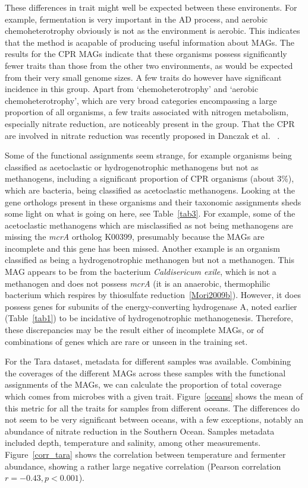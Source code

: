 \documentclass[10pt,letterpaper]{article}
\begin{document}
These differences in trait might well be expected between these environents. For example, fermentation is very important in the AD process, and aerobic chemoheterotrophy obviously is not as the environment is aerobic. This indicates that the method is acapable of producing useful information about MAGs. The results for the CPR MAGs indicate that these organisms possess significantly fewer traits than those from the other two environments, as would be expected from their very small genome sizes. A few traits do however have significant incidence in this group. Apart from `chemoheterotrophy' and `aerobic chemoheterotrophy', which are very broad categories encompassing a large proportion of all organisms, a few traits associated with nitrogen metabolism, especially nitrate reduction, are noticeably present in the group. That the CPR are involved in nitrate reduction was recently proposed in Danczak et al. ~\cite{Danczak2017}.

Some of the functional assignments seem strange, for example organisms being classified as acetoclastic or hydrogenotrophic methanogens but not as methanogens, including a significant proportion of CPR organisms (about 3\%), which are bacteria, being classified as acetoclastic methanogens. Looking at the gene orthologs present in these organisms and their taxonomic assignments sheds some light on what is going on here, see Table~\ref{tab3}. For example, some of the acetoclastic methanogens which are misclassified as not being methanogens are missing the \emph{mcrA} ortholog K00399, presumably because the MAGs are incomplete and this gene has been missed. Another example is an organism classified as being a hydrogenotrophic methanogen but not a methanogen. This MAG appears to be from the bacterium \emph{Caldisericum exile}, which is not a methanogen and does not possess \emph{mcrA} (it is an anaerobic, thermophilic bacterium which respires by thiosulfate reduction~\ref{Mori2009b}). However, it does possess genes for subunits of the energy-converting hydrogenase A, noted earlier (Table~\ref{tab1}) to be incidative of hydrogenotrophic methanogenesis. Therefore, these discrepancies may be the result either of incomplete MAGs, or of combinations of genes which are rare or unseen in the training set.

For the Tara dataset, metadata for different samples was available. Combining the coverages of the different MAGs across these samples with the functional assignments of the MAGs, we can calculate the proportion of total coverage which comes from microbes with a given trait. Figure~\ref{oceans} shows the mean of this metric for all the traits for samples from different oceans. The differences do not seem to be very significant between oceans, with a few exceptions, notably an abundance of nitrate reduction in the Southern Ocean. Samples metadata included depth, temperature and salinity, among other measurements. Figure~\ref{corr_tara} shows the correlation between temperature and fermenter abundance, showing a rather large negative correlation (Pearson correlation $r=-0.43, p<0.001$).
\end{document}
